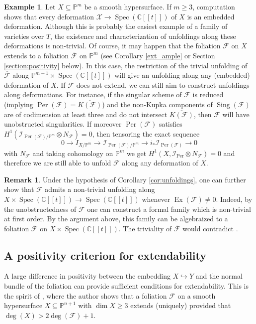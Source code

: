 \documentclass[reqno]{amsart}
\theoremstyle{plain}
\newcommand\C{\mathbb{C}}
\renewcommand\P{\mathbb{P}}
\newcommand{\I}{\mathcal{I}}
\renewcommand{\I}{\mathcal{I}}
\newcommand{\X}{\mathcal{X}}
\newcommand{\F}{\mathscr{F}}
\DeclareMathOperator{\Spec}{Spec}
\DeclareMathOperator{\Ex}{Ex}
\DeclareMathOperator{\Sing}{Sing}
\DeclareMathOperator{\Per}{Per}
\newcounter{Theorem}
\theoremstyle{definition}
\newtheorem{remark}[theorem]{Remark}
\newtheorem{example}[theorem]{Example}
\theoremstyle{named}
\begin{document}
\begin{example}
Let $X\subseteq \P^{m}$ be a smooth hypersurface. If $m\geq 3$, computation shows that every deformation $\X\to \Spec(\C[[t]])$ of $X$ is an embedded deformation. Although this is probably the easiest example of a family of varieties over $T$, the existence and characterization of unfoldings along these deformations is non-trivial. Of course, it may happen that the foliation $\F$ on $X$ extends to a foliation $\overline{\F}$ on $\P^{m}$ (see Corollary \ref{ext_ample} or Section \ref{section:positivity} below).  In this case, the restriction of the trivial unfolding of $\overline{\F}$ along $\P^{m+1} \times \Spec(\C[[t]])$ will give an unfolding along any (embedded) deformation of $X$. If $\F$ does not extend, we can still aim to construct unfoldings along deformations. For instance, if the singular scheme of $\F$ is reduced (implying $\Per(\F)=\overline{K(\F)}$) and the non-Kupka components of $\Sing(\F)$ are of codimension at least three and do not intersect $\overline{K(\F)}$, then $\F$ will have unobstructed singularities. If moreover $\Per(\F)$ satisfies $H^1(\I_{\Per(\F)/\P^{m}}\otimes N_\F)=0$, then tensoring the exact sequence
$$ 0\rightarrow I_{X/\P^{m}}\rightarrow \I_{\Per(\F)/\P^{m}}\rightarrow i_*\I_{\Per(\F)}\rightarrow 0
$$
with $N_\F$ and taking cohomology on $\P^{m}$ we get  $H^1(X,\I_{\Per}\otimes N_\F)=0$ and therefore we are still able to unfold $\F$ along any deformation of $X$. 
\end{example}


\begin{remark}
     Under the hypothesis of Corollary \ref{cor:unfoldings}, one can further show that  $\F$ admits a non-trivial unfolding along $X\times \Spec(\C[[t]])\to \Spec(\C[[t]])$ whenever $\Ex(\F)\neq 0$. Indeed, by the unobstructedness of $\F$ one can construct a formal family which is non-trivial at first order. By the argument above, this family can be algebraized to a foliation $\overline{\F}$ on $X\times \Spec(\C[[t]])$. The triviality of $\overline{\F}$ would contradict \cite[Theorem 5.1.4]{EGAIIIp1}. 
\end{remark}

\subsection{A positivity criterion for extendability}\label{section4.2}
\label{section:positivity}
A large difference in positivity between the embedding $X\hookrightarrow Y$ and the normal bundle of the foliation can provide sufficient conditions for extendability.
This is the spirit of \cite{figueira2023extensions}, where the author shows that a foliation $\F$ on a smooth hypersurface $X\subseteq \P^{n+1}$ with $\dim X\geqslant 3$ extends (uniquely) provided that $\deg(X)> 2\deg(\F)+1$. 
\end{document}
